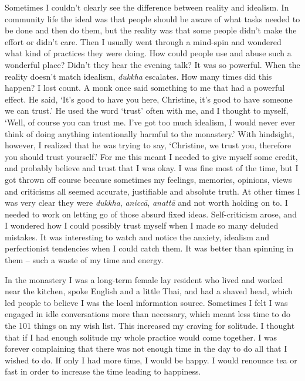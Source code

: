 Sometimes I couldn't clearly see the difference between reality and
idealism. In community life the ideal was that people should be aware of
what tasks needed to be done and then do them, but the reality was that
some people didn't make the effort or didn't care. Then I usually went
through a mind-spin and wondered what kind of practices they were doing. 
How could people use and abuse such a wonderful place? Didn't they hear
the evening talk? It was so powerful. When the reality doesn't match
idealism, \emph{dukkha} escalates. How many times did this happen? I
lost count. A monk once said something to me that had a powerful effect. 
He said, `It's good to have you here, Christine, it's good to have
someone we can trust.' He used the word `trust' often with me, and I
thought to myself, `Well, of course you can trust me. I've got too much
idealism, I would never ever think of doing anything intentionally
harmful to the monastery.' With hindsight, however, I realized that he
was trying to say, `Christine, we trust you, therefore you should trust
yourself.' For me this meant I needed to give myself some credit, and
probably believe and trust that I was okay. I was fine most of the time, 
but I got thrown off course because sometimes my feelings, memories, 
opinions, views and criticisms all seemed accurate, justifiable and
absolute truth. At other times I was very clear they were \emph{dukkha}, 
\emph{aniccā}, \emph{anattā} and not worth holding on to. I needed to
work on letting go of those absurd fixed ideas. Self-criticism arose, 
and I wondered how I could possibly trust myself when I made so many
deluded mistakes. It was interesting to watch and notice the anxiety, 
idealism and perfectionist tendencies when I could catch them. It was
better than spinning in them -- such a waste of my time and energy. 

In the monastery I was a long-term female lay resident who lived and
worked near the kitchen, spoke English and a little Thai, and had a
shaved head, which led people to believe I was the local information
source. Sometimes I felt I was engaged in idle conversations more than
necessary, which meant less time to do the 101 things on my wish list. 
This increased my craving for solitude. I thought that if I had enough
solitude my whole practice would come together. I was forever
complaining that there was not enough time in the day to do all that I
wished to do. If only I had more time, I would be happy. I would
renounce tea or fast in order to increase the time leading to happiness. 

